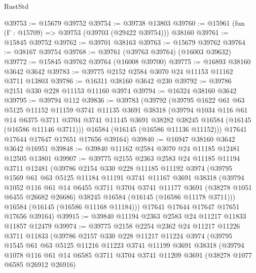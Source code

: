 \begin{lexlean}{RustStd}
\begin{coremodule}
@39753 := @15679 @39752
@39754 := @39738 @13803
@39760 := @15961 (fun (Γ : @15709) => @39753 (@39703 (@29422 @39754))) @38160
@39761 := @15845 @39752
@39762 := @39701 @38163
@39763 := @15679 @39762
@39764 := @38167 @39754
@39768 := @39761 (@39763 @39764) (@16003 @39632)
@39772 := @15845 @39762 @39764 (@16008 @39700)
@39775 := @16893 @38160 @3642 @3642
@39783 := @39775 @2152 @2584 @3070 @24 @11153 @11162 @3711 @13803
@39786 := @16311 @38160 @3642 @230
@39792 := @39786 @2151 @330 @228 @11153 @11160 @3974
@39794 := @16324 @38160 @3642
@39795 := @39794 @112
@39836 := @39783
    (@39792
      (@39795
        @1622
        @61
        @63
        @5125
        @11152
        @11159
        @3741
        @11135
        @3691
        @38318
        (@39794
          @1034
          @116
          @61
          @14
          @6375
          @3711
          @3704
          @3741
          @11145
          @3691
          @38282
          @38245
          @16584
          (@16145 (@16586 @11146 @3711)))
        @16584
        (@16145 (@16586 @11136 @11152)))
      @17641
      @17644
      @17647
      @17651
      @17656
      @39164)
@39840 := @16947 @38160 @3642 @3642 @16951
@39848 := @39840 @11162 @2584 @3070 @24 @11185 @12481 @12505 @13801
@39907 := @39775
    @2155
    @2363
    @2583
    @24
    @11185
    @11194
    @3711
    @12481
    (@39786
      @2154
      @330
      @228
      @11185
      @11192
      @3974
      (@39795
        @1569
        @61
        @63
        @5125
        @11184
        @11191
        @3741
        @11167
        @3691
        @38318
        (@39794
          @1052
          @116
          @61
          @14
          @6455
          @3711
          @3704
          @3741
          @11177
          @3691
          (@38278 @1051 @6455 @26682 @26686)
          @38245
          @16584
          (@16145 (@16586 @11178 @3711)))
        @16584
        (@16145 (@16586 @11168 @11184)))
      @17641
      @17644
      @17647
      @17651
      @17656
      @39164)
@39915 := @39840 @11194 @2363 @2583 @24 @11217 @11833 @11857 @12479
@39974 := @39775
    @2158
    @2254
    @2362
    @24
    @11217
    @11226
    @3711
    @11833
    (@39786
      @2157
      @330
      @228
      @11217
      @11224
      @3974
      (@39795
        @1545
        @61
        @63
        @5125
        @11216
        @11223
        @3741
        @11199
        @3691
        @38318
        (@39794
          @1078
          @116
          @61
          @14
          @6585
          @3711
          @3704
          @3741
          @11209
          @3691
          (@38278 @1077 @6585 @26912 @26916)

\end{coremodule}
\end{lexlean}
